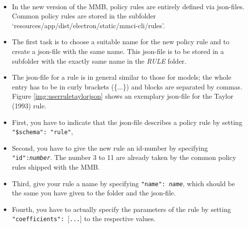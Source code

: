\\
\begin{itemize}
\item In the new version of the MMB, policy rules are entirely defined via json-files. Common policy rules are stored in the subfolder `resources/app/dist/electron/static/mmci-cli/rules'.
\item The first task is to choose a suitable name for the new policy rule and to create a json-file with the same name. This json-file is to be stored in a subfolder with the exactly same name in the \textit{RULE} folder.
\item The json-file for a rule is in general similar to those for models; the whole entry has to be in curly brackets (\{...\}) and blocks are separated by commas. Figure \ref{img:userruletaylorjson} shows an exemplary json-file for the Taylor (1993) rule.
\item First, you have to indicate that the json-file describes a policy rule by setting \texttt{"\$schema": "rule"},
\item Second, you have to give the new rule an id-number by specifying \texttt{"id":\textit{number}}. The number 3 to 11 are already taken by the common policy rules shipped with the MMB.
\item Third, give your rule a name by specifying \texttt{"name": \textit{name}}, which should be the same you have given to the folder and the json-file.
\item Fourth, you have to actually specify the parameters of the rule by setting \texttt{"coefficients": $[$...$]$} to the respective values.

\end{itemize}
